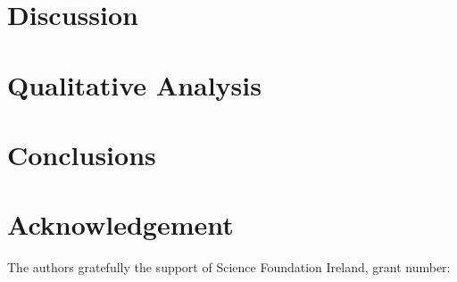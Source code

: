\documentclass[letterpaper]{article}
\begin{document}
\section{Discussion}\label{sec:discuss}

\section{Qualitative Analysis}


\section{Conclusions}\label{sec:conc}

\section{Acknowledgement}
The authors gratefully the support of Science Foundation Ireland, grant number:


\end{document}
